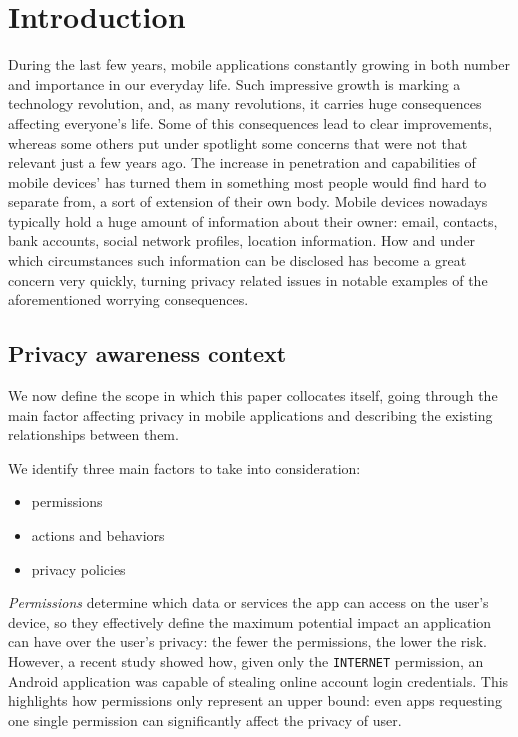 \documentclass[twoside,letterpaper]{soups}
\theoremstyle{definition}
\begin{document}
\section{Introduction}
\label{sec:intro}
During the last few years, mobile applications constantly growing in both number and importance in our everyday life.
Such impressive growth is marking a technology revolution, and, as many revolutions, it carries huge consequences affecting everyone's life. Some of this consequences lead to clear improvements, whereas some others put under spotlight some concerns that were not that relevant just a few years ago.
The increase in penetration and capabilities of mobile devices' has turned them in something most people would find hard to separate from, a sort of extension of their own body. Mobile devices nowadays typically hold a huge amount of information about their owner: email, contacts, bank accounts, social network profiles, location information.
How and under which circumstances such information can be disclosed has become a great concern very quickly, turning privacy related issues in notable examples of the aforementioned worrying consequences.

\subsection{Privacy awareness context}
We now define the scope in which this paper collocates itself, going through the main factor affecting privacy in mobile applications and describing the existing relationships between them.

We identify three main factors to take into consideration:
\begin{itemize}
       \item permissions
       \item actions and behaviors
       \item privacy policies
\end{itemize}

\emph{Permissions} determine which data or services the app can access on the user's device, so they effectively define the maximum potential impact an application can have over the user's privacy: the fewer the permissions, the lower the risk. However, a recent study \cite{stickley} showed how, given only the \texttt{INTERNET} permission, an Android application was capable of stealing online account login credentials.
This highlights how permissions only represent an upper bound: even apps requesting one single permission can significantly affect the privacy of user.
\end{document}
